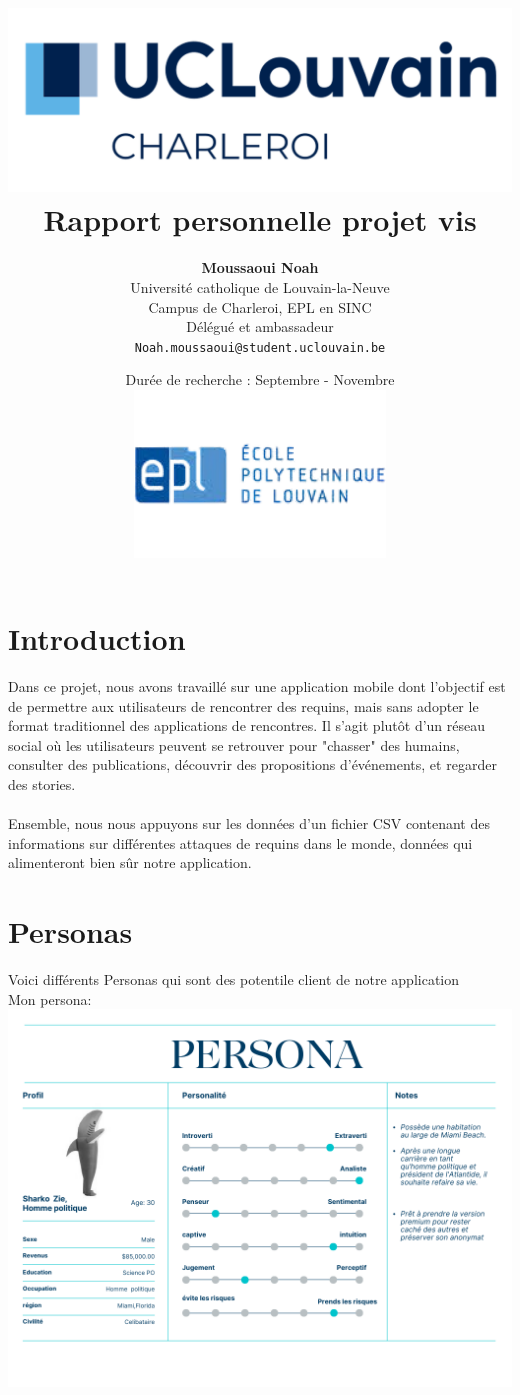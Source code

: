 \documentclass{article}
\title{
    \includegraphics[width=1\textwidth]{photo/UCLouvain_Charleroi.png} \\
    \vspace{1.5cm}
    {\Huge \textbf{Rapport personnelle projet vis}} \\
    \vspace{1.5cm}
}
\author{
    \textbf{Moussaoui Noah} \\
    Université catholique de Louvain-la-Neuve \\
    Campus de Charleroi, EPL en SINC \\
    Délégué et ambassadeur \\
    \texttt{Noah.moussaoui@student.uclouvain.be}
}
\date{
    \vspace{1.5cm}
    Durée de recherche : Septembre - Novembre \\
     \vspace{1.5cm}
    \includegraphics[width=0.5\textwidth]{photo/EPL.png}
}
\begin{document}
\maketitle
\newpage
\section{Introduction}
Dans ce projet, nous avons travaillé sur une application mobile dont l'objectif est de permettre 
aux utilisateurs de rencontrer des requins, mais sans adopter le format traditionnel des applications
de rencontres. Il s'agit plutôt d'un réseau social où les utilisateurs peuvent se retrouver pour 
"chasser" des humains, consulter des publications, découvrir des propositions d’événements, 
et regarder des stories.\\\\

Ensemble, nous nous appuyons sur les données d’un fichier CSV contenant des informations 
sur différentes attaques de requins dans le monde, données qui alimenteront bien sûr notre application.


\section{Personas}
Voici différents Personas qui sont des potentile client de notre application \\

Mon persona:\\

\includegraphics[width=1\textwidth]{photo/Personna_Sharkozie.png}\\
\end{document}
